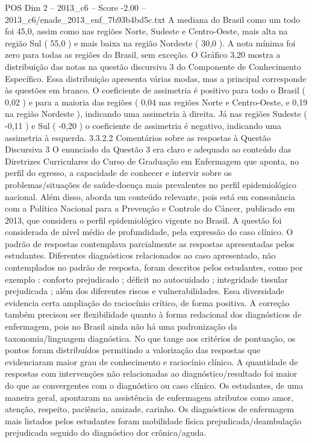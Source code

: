 \begin{textsample}{POS Dim 2 – 2013\_c6 – Score -2.00 – 2013\_c6/enade\_2013\_enf\_7b93b4bd5c.txt}
A mediana do Brasil como um todo foi 45,0, assim como nas regiões Norte, Sudeste e Centro-Oeste, mais alta na região Sul ( 55,0 ) e mais baixa na região Nordeste ( 30,0 ).
A nota mínima foi zero para todas as regiões do Brasil, sem exceção.
O Gráfico 3.20 mostra a distribuição das notas na questão discursiva 3 do Componente de Conhecimento Específico.
Essa distribuição apresenta várias modas, mas a principal corresponde às questões em branco.
O coeficiente de assimetria é positivo para todo o Brasil ( 0,02 ) e para a maioria das regiões ( 0,04 nas regiões Norte e Centro-Oeste, e 0,19 na região Nordeste ), indicando uma assimetria à direita.
Já nas regiões Sudeste ( -0,11 ) e Sul ( -0,20 ) o coeficiente de assimetria é negativo, indicando uma assimetria à esquerda. 3.3.2.2 Comentários sobre as respostas à Questão Discursiva 3 O enunciado da Questão 3 era claro e adequado ao conteúdo das Diretrizes Curriculares do Curso de Graduação em Enfermagem que aponta, no perfil do egresso, a capacidade de conhecer e intervir sobre os problemas/situações de saúde-doença mais prevalentes no perfil epidemiológico nacional.
Além disso, aborda um conteúdo relevante, pois está em consonância com a Política Nacional para a Prevenção e Controle do Câncer, publicado em 2013, que considera o perfil epidemiológico vigente no Brasil.
A questão foi considerada de nível médio de profundidade, pela expressão do caso clínico.
O padrão de respostas contemplava parcialmente as respostas apresentadas pelos estudantes.
Diferentes diagnósticos relacionados ao caso apresentado, não contemplados no padrão de resposta, foram descritos pelos estudantes, como por exemplo : conforto prejudicado ; déficit no autocuidado ; integridade tissular prejudicada ; além dos diferentes riscos e vulnerabilidades.
Essa diversidade evidencia certa ampliação do raciocínio crítico, de forma positiva.
A correção também precisou ser flexibilidade quanto à forma redacional dos diagnósticos de enfermagem, pois no Brasil ainda não há uma padronização da taxonomia/linguagem diagnóstica.
No que tange aos critérios de pontuação, os pontos foram distribuídos permitindo a valorização das respostas que evidenciaram maior grau de conhecimento e raciocínio clínico.
A quantidade de respostas com intervenções não relacionadas ao diagnóstico/resultado foi maior do que as convergentes com o diagnóstico ou caso clínico.
Os estudantes, de uma maneira geral, apontaram na assistência de enfermagem atributos como amor, atenção, respeito, paciência, amizade, carinho.
Os diagnósticos de enfermagem mais listados pelos estudantes foram mobilidade física prejudicada/deambulação prejudicada seguido do diagnóstico dor crônica/aguda.

\end{textsample}
